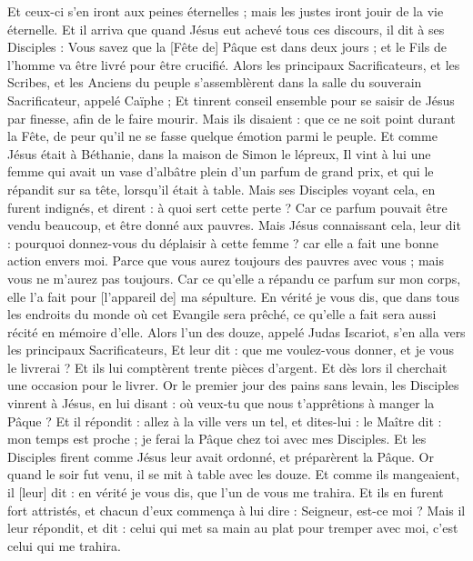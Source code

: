 \begin{multicols}{2}
Et ceux-ci s'en iront aux peines éternelles ; mais les justes iront jouir de la vie éternelle.
\VerseOne{}Et il arriva que quand Jésus eut achevé tous ces discours, il dit à ses Disciples :
Vous savez que la [Fête de] Pâque est dans deux jours ; et le Fils de l'homme va être livré pour être crucifié.
Alors les principaux Sacrificateurs, et les Scribes, et les Anciens du peuple s'assemblèrent dans la salle du souverain Sacrificateur, appelé Caïphe ;
Et tinrent conseil ensemble pour se saisir de Jésus par finesse, afin de le faire mourir.
Mais ils disaient : que ce ne soit point durant la Fête, de peur qu'il ne se fasse quelque émotion parmi le peuple.
Et comme Jésus était à Béthanie, dans la maison de Simon le lépreux,
Il vint à lui une femme qui avait un vase d'albâtre plein d'un parfum de grand prix, et qui le répandit sur sa tête, lorsqu'il était à table.
Mais ses Disciples voyant cela, en furent indignés, et dirent : à quoi sert cette perte ?
Car ce parfum pouvait être vendu beaucoup, et être donné aux pauvres.
Mais Jésus connaissant cela, leur dit : pourquoi donnez-vous du déplaisir à cette femme ? car elle a fait une bonne action envers moi.
Parce que vous aurez toujours des pauvres avec vous ; mais vous ne m'aurez pas toujours.
Car ce qu'elle a répandu ce parfum sur mon corps, elle l'a fait pour [l'appareil de] ma sépulture.
En vérité je vous dis, que dans tous les endroits du monde où cet Evangile sera prêché, ce qu'elle a fait sera aussi récité en mémoire d'elle.
Alors l'un des douze, appelé Judas Iscariot, s'en alla vers les principaux Sacrificateurs,
Et leur dit : que me voulez-vous donner, et je vous le livrerai ? Et ils lui comptèrent trente pièces d'argent.
Et dès lors il cherchait une occasion pour le livrer.
Or le premier jour des pains sans levain, les Disciples vinrent à Jésus, en lui disant : où veux-tu que nous t'apprêtions à manger la Pâque ?
Et il répondit : allez à la ville vers un tel, et dites-lui : le Maître dit : mon temps est proche ; je ferai la Pâque chez toi avec mes Disciples.
Et les Disciples firent comme Jésus leur avait ordonné, et préparèrent la Pâque.
Or quand le soir fut venu, il se mit à table avec les douze.
Et comme ils mangeaient, il [leur] dit : en vérité je vous dis, que l'un de vous me trahira.
Et ils en furent fort attristés, et chacun d'eux commença à lui dire : Seigneur, est-ce moi ?
Mais il leur répondit, et dit : celui qui met sa main au plat pour tremper avec moi, c'est celui qui me trahira.

\end{multicols}
